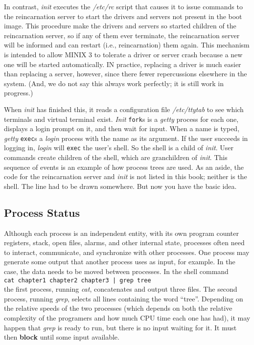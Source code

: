\documentclass{book}
\newcommand {\kw}  [1] {\textbf{#1}}
\newcommand {\sys} [1] {\textsl{#1}}
\newcommand {\cmd} [1] {\texttt{#1}}
\begin{document}
In contrast, \sys{init} executes the \sys{/etc/rc} script that causes it to issue commands to the reincarnation server
to start the drivers and servers not present in the boot image.
This procedure make the drivers and servers so started children of the reincarnation server,
so if any of them ever terminate, the reincarnation server will be informed and can restart (i.e., reincarnation) them again.
This mechanism is intended to allow MINIX 3 to tolerate a driver or server crash because a new one will be started automatically.
IN practice, replacing a driver is much easier than replacing a server, however,
since there fewer repercussions elsewhere in the system.
(And, we do not say this always work perfectly; it is still work in progress.)

When \sys{init} has finished this, it reads a configuration file \sys{/etc/ttytab} to see which terminals and virtual terminal exist.
\sys{Init} \cmd{fork}s is a \sys{getty} process for each one, displays a login prompt on it, and then wait for input.
When a name is typed, \sys{getty} \cmd{exec}s a \sys{login} process with the name as its argument.
If the user succeeds in logging in, \sys{login} will \cmd{exec} the user's shell.
So the shell is a child of \sys{init}.
User commands create children of the shell, which are granchildren of \sys{init}.
This sequence of events is an example of how process trees are used.
As an aside, the code for the reincarnation server and \sys{init} is not listed in this book; neither is the shell.
The line had to be drawn somewhere.
But now you have the basic idea.

\subsection{Process Status}
Although each process is an independent entity, 
with its own program counter registers, stack, open files, alarms, and other internal state,
processes often need to interact, communicate, and synchronize with other processes.
One process may generate some output that another process uses as input, for example.
In the case, the data needs to be moved between processes.
In the shell command\\
\cmd{cat chapter1 chapter2 chapter3 | grep tree}\\
the first process, running \sys{cat}, concatenates and output three files.
The second process, running \sys{grep}, selects all lines containing the word ``tree''.
Depending on the relative speeds of the two processes (which depends on both 
the relative complexity of the programers and how much CPU time each one has had),
it may happen that \sys{grep} is ready to run, but there is no input waiting for it.
It must then \kw{block} until some input available.
\end{document}
